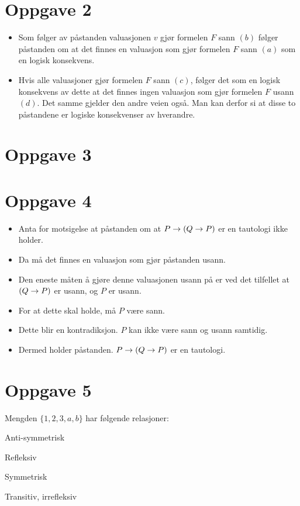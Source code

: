 \documentclass{in1150-innlevering}
\begin{document}
\section*{Oppgave 2}
    \begin{itemize}
        \item
            Som følger av påstanden valuasjonen $v$ gjør formelen $F$ sann $(b)$ følger påstanden om at det finnes en valuasjon som gjør formelen $F$ sann $(a)$ som en logisk konsekvens.  \item
            Hvis alle valuasjoner gjør formelen $F$ sann $(c)$, følger det som en logisk konsekvens av dette at det finnes ingen valuasjon som gjør formelen $F$ usann $(d)$. Det samme gjelder den andre veien også. Man kan derfor si at disse to påstandene er logiske konsekvenser av hverandre.
    \end{itemize}

\section*{Oppgave 3}
\section*{Oppgave 4}
    \begin{itemize}
        \item
            Anta for motsigelse at påstanden om at $P \mathrel{\rightarrow} (Q \mathrel{\rightarrow} P)$ er en tautologi ikke holder.
        \item
            Da må det finnes en valuasjon som gjør påstanden usann.
        \item
            Den eneste måten å gjøre denne valuasjonen usann på er ved det tilfellet at $(Q \mathrel{\rightarrow} P)$ er usann, og $P$ er usann.
        \item
            For at dette skal holde, må $P$ være sann.
        \item
            Dette blir en kontradiksjon. $P$ kan ikke være sann og usann samtidig.
        \item
            Dermed holder påstanden. $P \mathrel{\rightarrow} (Q \mathrel{\rightarrow} P)$ er en tautologi.
    \end{itemize}

\section*{Oppgave 5}
    Mengden $\{1,2,3,a,b\}$ har følgende relasjoner:
    \begin{deloppgaver}
        \item Anti-symmetrisk
        \item Refleksiv
        \item Symmetrisk
        \item Transitiv, irrefleksiv
    \end{deloppgaver}
\end{document}
